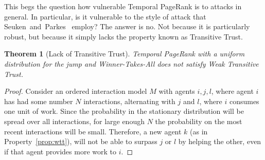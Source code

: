 \documentclass[a4paper,11pt]{book}
\newtheorem{theorem}{Theorem}
\theoremstyle{definition}
\begin{document}
This begs the question how vulnerable Temporal PageRank is to attacks in general. In particular, is
it vulnerable to the style of attack that Seuken~and~Parkes~\cite{seuken2014sybil} employ? The
answer is no. Not because it is particularly robust, but because it simply lacks the property
known as Transitive Trust.

\begin{theorem}[Lack of Transitive Trust]
    Temporal PageRank with a uniform distribution for the jump and Winner-Takes-All does not satisfy Weak Transitive Trust.
    \label{thm:no_trans_trust}
\end{theorem}

\begin{proof}
    Consider an ordered interaction model $M$ with agents $i, j, l$, 
    where agent $i$ has had some number $N$ interactions,
    alternating with $j$ and $l$, where $i$ consumes one unit of work. 
    Since the probability in the stationary distribution will
    be spread over all interactions, for large enough $N$ the probability on the most recent
    interactions will be small. Therefore, a new agent $k$ (as in Property~\ref{prop:wtt}), will
    not be able to surpass $j$ or $l$ by helping the other, even if that agent provides more
    work to $i$.
\end{proof}
\end{document}
